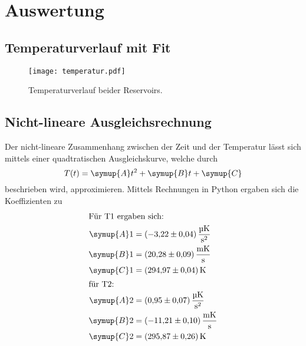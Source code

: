 \section{Auswertung}
\label{sec:Auswertung}
\subsection{Temperaturverlauf mit Fit}
\begin{figure}
  \centering
  \texttt{[image: temperatur.pdf]}
  \caption{Temperaturverlauf beider Reservoirs.}
  \label{fig:temperatur}
\end{figure}
\subsection{Nicht-lineare Ausgleichsrechnung}
Der nicht-lineare Zusammenhang zwischen der Zeit und der Temperatur lässt sich mittels einer quadtratischen Ausgleichskurve, welche durch 
\begin{equation}
  T(t) = \symup{A}t^2 + \symup{B}t + \symup{C}
\end{equation}
beschrieben wird, approximieren. Mittels Rechnungen in Python ergaben sich die Koeffizienten zu
\begin{align}
  \intertext{Für T1 ergaben sich:}
  \symup{A}1 &= \SI{-3.22(4)}{\micro\kelvin\per\second\tothe{2}} \\ 
  \symup{B}1 &= \SI{20.28(9)}{\milli\kelvin\per\second} \\
  \symup{C}1 &= \SI{294.97(4)}{\kelvin}  \\
  \intertext{für T2:}
  \symup{A}2 &= \SI{0.95(7)}{\micro\kelvin\per\second\tothe{2}}\\
  \symup{B}2 &= \SI{-11.21(10)}{\milli\kelvin\per\second}\\
  \symup{C}2 &= \SI{295.87(26)}{\kelvin}
\end{align}
